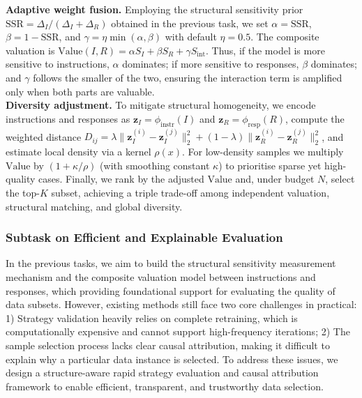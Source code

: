 \documentclass[12pt,a4paper]{article}
\begin{document}
\textbf{Adaptive weight fusion.} Employing the structural sensitivity prior $\text{SSR}=\Delta_I/(\Delta_I+\Delta_R)$ obtained in the previous task, we set $\alpha=\text{SSR}$, $\beta=1-\text{SSR}$, and $\gamma=\eta\min(\alpha,\beta)$ with default $\eta=0.5$. The composite valuation is $\text{Value}(I,R)=\alpha S_I+\beta S_R+\gamma S_{\text{int}}$. Thus, if the model is more sensitive to instructions, $\alpha$ dominates; if more sensitive to responses, $\beta$ dominates; and $\gamma$ follows the smaller of the two, ensuring the interaction term is amplified only when both parts are valuable.\\
\textbf{Diversity adjustment.} To mitigate structural homogeneity, we encode instructions and responses as $\mathbf z_I=\phi_{\text{instr}}(I)$ and $\mathbf z_R=\phi_{\text{resp}}(R)$, compute the weighted distance $D_{ij}= \lambda\|\mathbf z_I^{(i)}-\mathbf z_I^{(j)}\|_2^2+(1-\lambda)\|\mathbf z_R^{(i)}-\mathbf z_R^{(j)}\|_2^2$, and estimate local density via a kernel $\rho(x)$. For low-density samples we multiply $\text{Value}$ by $(1+\kappa/\rho)$ (with smoothing constant $\kappa$) to prioritise sparse yet high-quality cases. Finally, we rank by the adjusted $\text{Value}$ and, under budget $N$, select the top-$K$ subset, achieving a triple trade-off among independent valuation, structural matching, and global diversity.



\vspace{-10pt}
\subsubsection{Subtask on Efficient and Explainable Evaluation}
\label{subsubsec:eval_explain}
\vspace{-5pt}
In the previous tasks, we aim to build the structural sensitivity measurement mechanism and the composite valuation model between instructions and responses, which providing foundational support for evaluating the quality of data subsets. However, existing methods still face two core challenges in practical: 1) Strategy validation heavily relies on complete retraining, which is computationally expensive and cannot support high-frequency iterations; 2) The sample selection process lacks clear causal attribution, making it difficult to explain why a particular data instance is selected. To address these issues, we design a structure-aware rapid strategy evaluation and causal attribution framework to enable efficient, transparent, and trustworthy data selection.
\end{document}

